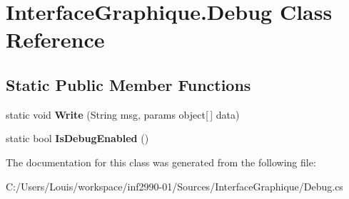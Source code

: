 \hypertarget{class_interface_graphique_1_1_debug}{}\section{Interface\+Graphique.\+Debug Class Reference}
\label{class_interface_graphique_1_1_debug}
\subsection*{Static Public Member Functions}
\begin{DoxyCompactItemize}
\item 
\hypertarget{class_interface_graphique_1_1_debug_a540c6c5d53e75f5710492b0254eaf0a3}{}static void {\bfseries Write} (String msg, params object\mbox{[}$\,$\mbox{]} data)\label{class_interface_graphique_1_1_debug_a540c6c5d53e75f5710492b0254eaf0a3}

\item 
\hypertarget{class_interface_graphique_1_1_debug_a86721cc22d894c08f05abfb82e07f494}{}static bool {\bfseries Is\+Debug\+Enabled} ()\label{class_interface_graphique_1_1_debug_a86721cc22d894c08f05abfb82e07f494}

\end{DoxyCompactItemize}


The documentation for this class was generated from the following file\+:\begin{DoxyCompactItemize}
\item 
C\+:/\+Users/\+Louis/workspace/inf2990-\/01/\+Sources/\+Interface\+Graphique/Debug.\+cs\end{DoxyCompactItemize}
